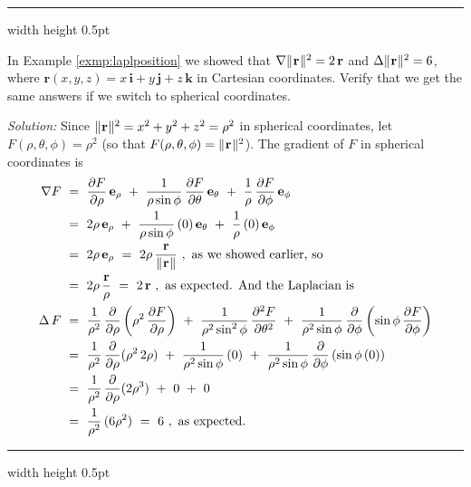\hrule width \textwidth height 0.5pt
\begin{exmp}
 In Example \ref{exmp:laplposition} we showed that $\nabla \lVert\mspace{1mu}\mathbf{r}\mspace{1mu}\rVert^2 = 2\,\mathbf{r}$ and
 $\Delta \lVert\mspace{1mu}\mathbf{r}\mspace{1mu}\rVert^2 = 6$, where $\mathbf{r}(x,y,z) = x\,\mathbf{i} + y\,\mathbf{j} + z\,\mathbf{k}$ in
 Cartesian coordinates. Verify that we get the same answers if we switch to spherical coordinates.\smallskip
 \par\noindent \emph{Solution:} Since $\lVert\mspace{1mu}\mathbf{r}\mspace{1mu}\rVert^2 = x^2 + y^2 + z^2 = \rho^2$ in spherical
 coordinates, let $F(\rho,\theta,\phi) = \rho^2$ (so that $F(\rho,\theta,\phi) =
 \lVert\mspace{1mu}\mathbf{r}\mspace{1mu}\rVert^2$). The gradient of $F$ in spherical coordinates is
 \begin{align*}
  \nabla F ~&=~ \frac{\partial F}{\partial \rho}\,\mathbf{e}_{\rho} ~+~
   \frac{1}{\rho \sin \phi}\,\frac{\partial F}{\partial \theta}\,\mathbf{e}_{\theta} ~+~
   \frac{1}{\rho}\,\frac{\partial F}{\partial \phi}\,\mathbf{e}_{\phi}\\
   &=~ 2\rho\,\mathbf{e}_{\rho} ~+~ \frac{1}{\rho \sin \phi}\,(0)\,\mathbf{e}_{\theta} ~+~
    \frac{1}{\rho}\,(0)\,\mathbf{e}_{\phi}\\
   &=~ 2\rho\,\mathbf{e}_{\rho} ~=~ 2\rho\,\frac{\mathbf{r}}{\lVert\mspace{1mu}\mathbf{r}\mspace{1mu}\rVert} ~,~\text{as we showed earlier, so}\\
   &=~ 2\rho\,\frac{\mathbf{r}}{\rho} ~=~ 2\,\mathbf{r} ~,~\text{as expected. And the Laplacian is}\\
  \Delta\,F ~&=~ \frac{1}{\rho^2}\,\frac{\partial}{\partial \rho} \left( \rho^2 \,
   \frac{\partial F}{\partial \rho} \right) ~+~ \frac{1}{\rho^2 \sin^2 \phi}\,\frac{\partial^2 F}{\partial \theta^2} ~+~
   \frac{1}{\rho^2 \sin \phi}\,\frac{\partial}{\partial \phi} \left( \sin \phi \,\frac{\partial F}{\partial \phi}
   \right)\\
   &=~ \frac{1}{\rho^2}\,\frac{\partial}{\partial \rho} ( \rho^2 \,2\rho ) ~+~ \frac{1}{\rho^2 \sin \phi}\,(0) ~+~
    \frac{1}{\rho^2 \sin \phi}\,\frac{\partial}{\partial \phi} \left( \sin \phi \,(0) \right)\\
   &=~ \frac{1}{\rho^2}\,\frac{\partial}{\partial \rho} ( 2\rho^3 ) ~+~ 0 ~+~ 0\\
   &=~ \frac{1}{\rho^2}\,(6\rho^2 ) ~=~ 6 ~,~\text{as expected.}
 \end{align*}
\end{exmp}
\hrule width \textwidth height 0.5pt

